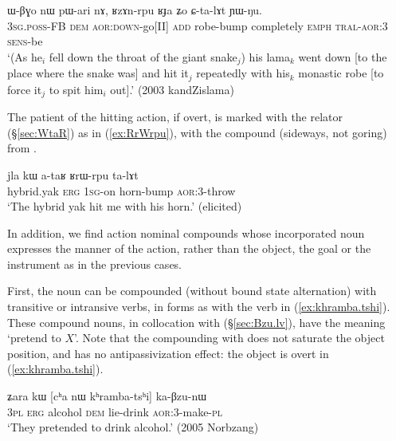 \begin{exe}
\ex \label{ex:RzAnrpu}
 \gll ɯ-βɣo nɯ pɯ-ari nɤ, ʁzɤn-rpu ʁɟa ʑo ɕ-ta-lɤt ɲɯ-ŋu. \\
 \textsc{3sg}.\textsc{poss}-FB \textsc{dem} \textsc{aor}:\textsc{down}-go[II] \textsc{add} robe-bump completely \textsc{emph} \textsc{tral}-\textsc{aor}:3\flobv{} \textsc{sens}-be \\
\glt `(As he$_i$ fell down the throat of the giant snake$_j$) his lama$_k$ went down [to the place where the snake was] and hit it$_j$ repeatedly with his$_k$  monastic robe [to force it$_j$ to spit him$_i$ out].' (2003 kandZislama)
\end{exe}

The patient of the hitting action, if overt, is marked with the relator   (§\ref{sec:WtaR}) as in (\ref{ex:RrWrpu}), with the compound  (sideways, not goring) from .
\newpage
\begin{exe}
\ex \label{ex:RrWrpu}
 \gll jla kɯ a-taʁ ʁrɯ-rpu ta-lɤt \\
 hybrid.yak \textsc{erg} \textsc{1sg}-on  horn-bump \textsc{aor}:3\flobv{}-throw \\
 \glt `The hybrid yak hit me with his horn.' (elicited)
\end{exe}
 
In addition, we find action nominal compounds whose incorporated noun expresses the manner of the action, rather than the object, the goal or the instrument as in the previous cases. 

First, the noun  can be compounded (without bound state alternation) with transitive or intransive verbs, in  forms as  with the verb  in (\ref{ex:khramba.tshi}). These compound nouns, in collocation with  (§\ref{sec:Bzu.lv}), have the meaning `pretend to $X$'. Note that the compounding with  does not saturate the object position, and has no antipassivization effect: the object  is overt in (\ref{ex:khramba.tshi}).

\begin{exe}
\ex \label{ex:khramba.tshi}
\gll ʑara kɯ [cʰa nɯ kʰramba-tsʰi] ka-βzu-nɯ \\
\textsc{3pl} \textsc{erg} alcohol \textsc{dem} lie-drink \textsc{aor}:3\flobv{}-make-\textsc{pl} \\
\glt `They pretended to drink alcohol.' (2005 Norbzang)
\end{exe}

